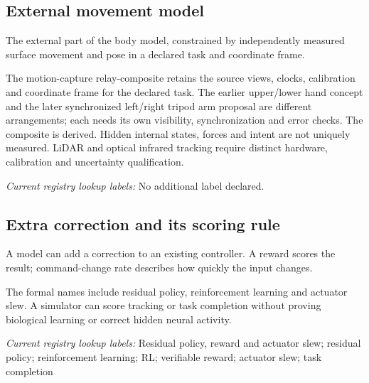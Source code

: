 \begin{samepage}
\subsection*{External movement model}
\noindent The external part of the body model, constrained by independently measured surface movement and pose in a declared task and coordinate frame.\par
\end{samepage}
\noindent The motion-capture relay-composite retains the source views, clocks, calibration and coordinate frame for the declared task. The earlier upper/lower hand concept and the later synchronized left/right tripod arm proposal are different arrangements; each needs its own visibility, synchronization and error checks. The composite is derived. Hidden internal states, forces and intent are not uniquely measured. LiDAR and optical infrared tracking require distinct hardware, calibration and uncertainty qualification.\par


\noindent\textit{Current registry lookup labels:} No additional label declared.\par

\begin{samepage}
\subsection*{Extra correction and its scoring rule}
\noindent A model can add a correction to an existing controller. A reward scores the result; command-change rate describes how quickly the input changes.\par
\end{samepage}
\begin{samepage}
\noindent The formal names include residual policy, reinforcement learning and actuator slew. A simulator can score tracking or task completion without proving biological learning or correct hidden neural activity.\par\nopagebreak[4]

\end{samepage}


\noindent\textit{Current registry lookup labels:} Residual policy, reward and actuator slew; residual policy; reinforcement learning; RL; verifiable reward; actuator slew; task completion\par

